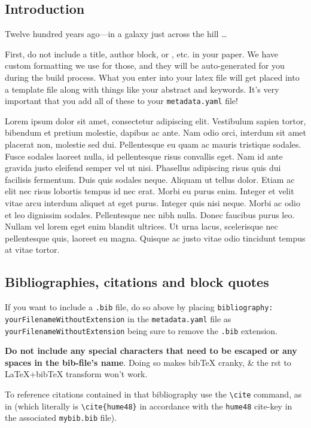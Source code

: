 
\subsection{Introduction \label{introduction}}

Twelve hundred years ago—in a galaxy just across the hill \ldots

First, do not include a title, author block, or \verb||, etc.
in your paper. We have custom formatting we use for those, and they will be
auto-generated for you during the build process. What you enter into your latex
file will get placed into a template file along with things like your abstract
and keywords. It's very important that you add all of these to your
\texttt{metadata.yaml} file!

Lorem ipsum dolor sit amet, consectetur adipiscing elit. Vestibulum sapien
tortor, bibendum et pretium molestie, dapibus ac ante. Nam odio orci, interdum
sit amet placerat non, molestie sed dui. Pellentesque eu quam ac mauris
tristique sodales. Fusce sodales laoreet nulla, id pellentesque risus convallis
eget. Nam id ante gravida justo eleifend semper vel ut nisi. Phasellus
adipiscing risus quis dui facilisis fermentum. Duis quis sodales neque. Aliquam
ut tellus dolor. Etiam ac elit nec risus lobortis tempus id nec erat. Morbi eu
purus enim. Integer et velit vitae arcu interdum aliquet at eget purus. Integer
quis nisi neque. Morbi ac odio et leo dignissim sodales. Pellentesque nec nibh
nulla. Donec faucibus purus leo. Nullam vel lorem eget enim blandit ultrices.
Ut urna lacus, scelerisque nec pellentesque quis, laoreet eu magna. Quisque ac
justo vitae odio tincidunt tempus at vitae tortor.

\subsection{Bibliographies, citations and block quotes \label{bibliographies-citations-and-block-quotes}}

If you want to include a \texttt{.bib} file, do so above by placing \verb|bibliography: yourFilenameWithoutExtension| in the \texttt{metadata.yaml} file as \verb|yourFilenameWithoutExtension| being sure to remove the \texttt{.bib} extension.

\textbf{Do not include any special characters that need to be escaped or any spaces in the bib-file's name}. Doing so makes bibTeX cranky, \& the rst to LaTeX+bibTeX transform won't work.

To reference citations contained in that bibliography use the \verb|\cite| command, as in \cite{hume48} (which literally is \verb|\cite{hume48}| in accordance with the \texttt{hume48} cite-key in the associated \texttt{mybib.bib} file).

